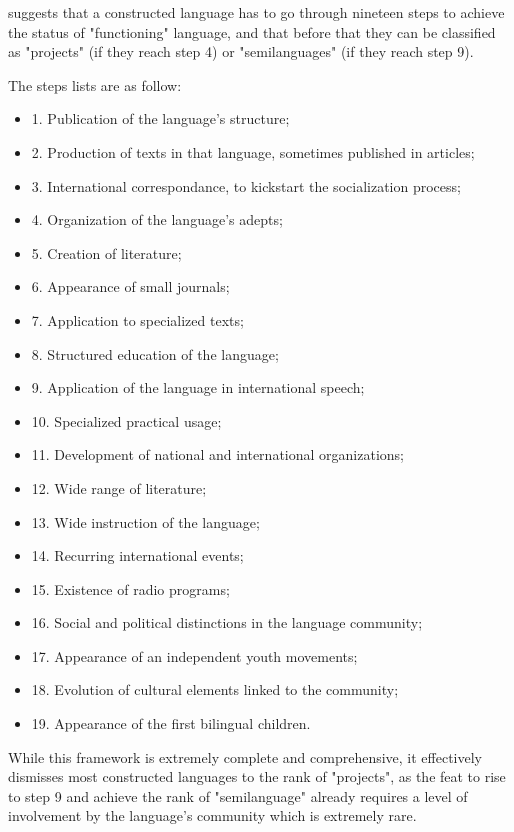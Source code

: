 \citeauthor{blanke1989planned} suggests that a constructed language has to go through nineteen steps to achieve
the status of "functioning" language, and that before that they can be classified as "projects" (if they reach
step 4) or "semilanguages" (if they reach step 9).\newline

The steps \citeauthor{blanke1989planned} lists are as follow:

\begin{itemize}
    \item 1. Publication of the language's structure;
    \item 2. Production of texts in that language, sometimes published in articles;
    \item 3. International correspondance, to kickstart the socialization process;
    \item 4. Organization of the language's adepts;
    \item 5. Creation of literature;
    \item 6. Appearance of small journals;
    \item 7. Application to specialized texts;
    \item 8. Structured education of the language;
    \item 9. Application of the language in international speech;
    \item 10. Specialized practical usage;
    \item 11. Development of national and international organizations;
    \item 12. Wide range of literature;
    \item 13. Wide instruction of the language;
    \item 14. Recurring international events;
    \item 15. Existence of radio programs;
    \item 16. Social and political distinctions in the language community;
    \item 17. Appearance of an independent youth movements;
    \item 18. Evolution of cultural elements linked to the community;
    \item 19. Appearance of the first bilingual children.
\end{itemize}

While this framework is extremely complete and comprehensive, it effectively dismisses most constructed
languages to the rank of "projects", as the feat to rise to step 9 and achieve the rank of "semilanguage"
already requires a level of involvement by the language's community which is extremely rare.\newline

